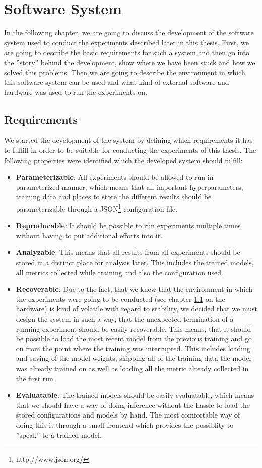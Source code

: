 \chapter{Software System}
In the following chapter, we are going to discuss the development of the software system used to conduct the experiments described later in this thesis. First, we are going to describe the basic requirements for such a system and then go into the ''story'' behind the development, show where we have been stuck and how we solved this problems. Then we are going to describe the environment in which this software system can be used and what kind of external software and hardware was used to run the experiments on.

\section{Requirements}
We started the development of the system by defining which requirements it has to fulfill in order to be suitable for conducting the experiments of this thesis. The following properties were identified which the developed system should fulfill:

\begin{itemize}
	\item \textbf{Parameterizable}: All experiments should be allowed to run in parameterized manner, which means that all important hyperparameters, training data and places to store the different results should be parameterizable through a JSON\footnote{http://www.json.org/} configuration file.
	\item \textbf{Reproducable}: It should be possible to run experiments multiple times without having to put additional efforts into it.
	\item \textbf{Analyzable}: This means that all results from all experiments should be stored in a distinct place for analysis later. This includes the trained models, all metrics collected while training and also the configuration used.
	\item \textbf{Recoverable}: Due to the fact, that we knew that the environment in which the experiments were going to be conducted (see chapter \ref{} on the hardware) is kind of volatile with regard to stability, we decided that we must design the system in such a way, that the unexpected termination of a running experiment should be easily recoverable. This means, that it should be possible to load the most recent model from the previous training and go on from the point where the training was interrupted. This includes loading and saving of the model weights, skipping all of the training data the model was already trained on as well as loading all the metric already collected in the first run.
	\item \textbf{Evaluatable}: The trained models should be easily evaluatable, which means that we should have a way of doing inference without the hassle to load the stored configurations and models by hand. The most comfortable way of doing this is through a small frontend which provides the possiblity to ''speak'' to a trained model.
\end{itemize}

